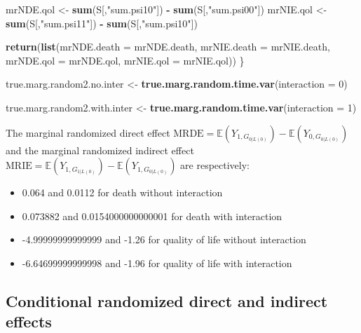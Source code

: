 \documentclass[
]{book}
\newenvironment{Shaded}{\begin{snugshade}}{\end{snugshade}}
\newcommand{\AttributeTok}[1]{\textcolor[rgb]{0.13,0.29,0.53}{#1}}
\newcommand{\DecValTok}[1]{\textcolor[rgb]{0.00,0.00,0.81}{#1}}
\newcommand{\FunctionTok}[1]{\textcolor[rgb]{0.13,0.29,0.53}{\textbf{#1}}}
\newcommand{\NormalTok}[1]{#1}
\newcommand{\OtherTok}[1]{\textcolor[rgb]{0.56,0.35,0.01}{#1}}
\newcommand{\SpecialCharTok}[1]{\textcolor[rgb]{0.81,0.36,0.00}{\textbf{#1}}}
\newcommand{\StringTok}[1]{\textcolor[rgb]{0.31,0.60,0.02}{#1}}
\providecommand{\tightlist}{%
  \setlength{\itemsep}{0pt}\setlength{\parskip}{0pt}}
\begin{document}
\begin{Shaded}
\begin{Highlighting}[]
\NormalTok{  mrNDE.qol }\OtherTok{\textless{}{-}} \FunctionTok{sum}\NormalTok{(S[,}\StringTok{"sum.psi10"}\NormalTok{]) }\SpecialCharTok{{-}} \FunctionTok{sum}\NormalTok{(S[,}\StringTok{"sum.psi00"}\NormalTok{])}
\NormalTok{  mrNIE.qol }\OtherTok{\textless{}{-}} \FunctionTok{sum}\NormalTok{(S[,}\StringTok{"sum.psi11"}\NormalTok{]) }\SpecialCharTok{{-}} \FunctionTok{sum}\NormalTok{(S[,}\StringTok{"sum.psi10"}\NormalTok{])}
  
  \FunctionTok{return}\NormalTok{(}\FunctionTok{list}\NormalTok{(}\AttributeTok{mrNDE.death =}\NormalTok{ mrNDE.death, }\AttributeTok{mrNIE.death =}\NormalTok{ mrNIE.death, }
              \AttributeTok{mrNDE.qol =}\NormalTok{ mrNDE.qol, }\AttributeTok{mrNIE.qol =}\NormalTok{ mrNIE.qol))}
\NormalTok{\}}
\end{Highlighting}
\end{Shaded}

\begin{Shaded}
\begin{Highlighting}[]
\NormalTok{true.marg.random2.no.inter }\OtherTok{\textless{}{-}} \FunctionTok{true.marg.random.time.var}\NormalTok{(}\AttributeTok{interaction =} \DecValTok{0}\NormalTok{)}

\NormalTok{true.marg.random2.with.inter }\OtherTok{\textless{}{-}} \FunctionTok{true.marg.random.time.var}\NormalTok{(}\AttributeTok{interaction =} \DecValTok{1}\NormalTok{)}
\end{Highlighting}
\end{Shaded}

The marginal randomized direct effect \(\text{MRDE}=\mathbb{E}\left(Y_{1,G_{0|L(0)}}\right) - \mathbb{E}\left(Y_{0,G_{0|L(0)}}\right)\) and the marginal randomized indirect effect \(\text{MRIE}=\mathbb{E}\left(Y_{1,G_{1|L(0)}}\right) - \mathbb{E}\left(Y_{1,G_{0|L(0)}}\right)\) are respectively:

\begin{itemize}
\tightlist
\item
  0.064 and 0.0112 for death without interaction
\item
  0.073882 and 0.0154000000000001 for death with interaction
\item
  -4.99999999999999 and -1.26 for quality of life without interaction
\item
  -6.64699999999998 and -1.96 for quality of life with interaction
\end{itemize}

\subsection{Conditional randomized direct and indirect effects}\label{conditional-randomized-direct-and-indirect-effects-1}
\end{document}
